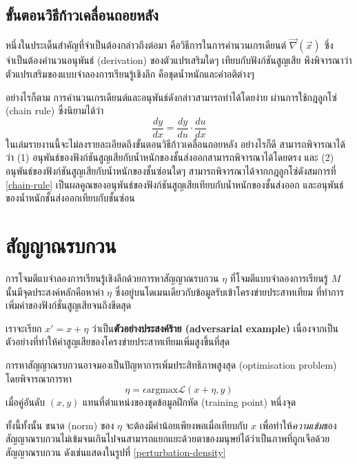 \documentclass{cpereport}
\begin{document}
\subsection{ขั้นตอนวิธีก้าวเคลื่อนถอยหลัง}

หนึ่งในประเด็นสำคัญที่จำเป็นต้องกล่าวถึงต่อมา คือวิธีการในการคำนวนเกรเดียนต์ $\vec{\nabla}(\vec{x})$ ซึ่งจำเป็นต้องคำนวนอนุพันธ์ (derivation) ของตัวแปรเสริมใดๆ เทียบกับฟังก์ชันสูญเสีย พึงพิจารณาว่าตัวแปรเสริมของแบบจำลองการเรียนรู้เชิงลึก คือชุดน้ำหนักและค่าอติต่างๆ

อย่างไรก็ตาม การคำนวนเกรเดียนต์และอนุพันธ์ดังกล่าวสามารถทำได้โดยง่าย ผ่านการใช้กฎลูกโซ่ (chain rule) ซึ่งนิยามได้ว่า
\begin{equation}
    \frac{dy}{dx} = \frac{dy}{du} \cdot \frac{du}{dx}
    \label{chain-rule}
\end{equation}
ในเล่มรายงานนี้จะไม่ลงรายละเอียดถึงขั้นตอนวิธีก้าวเคลื่อนถอยหลัง อย่างไรก็ดี สามารถพิจารณาได้ว่า (1) อนุพันธ์ของฟังก์ชันสูญเสียกับน้ำหนักของชั้นส่งออกสามารถพิจารณาได้โดยตรง และ (2) อนุพันธ์ของฟังก์ชันสูญเสียกับน้ำหนักของชั้นซ่อนใดๆ สามารถพิจารณาได้จากกฎลูกโซ่ดังสมการที่ \ref{chain-rule} เป็นผลคูณของอนุพันธ์ของฟังก์ชันสูญเสียเทียบกับน้ำหนักของชั้นส่งออก และอนุพันธ์ของน้ำหนักชั้นส่งออกเทียบกับชั้นซ่อน

\section{สัญญาณรบกวน}

การโจมตีแบจำลองการเรียนรู้เชิงลึกด้วยการหาสัญญาณรบกวน $\eta$ ที่โจมตีแบบจำลองการเรียนรู้ $M$ นั้นมีจุดประสงค์หลักคือหาค่า $\eta$ ซึ่งอยู่บนโดเมนเดียวกับข้อมูลรับเข้าโครงข่ายประสาทเทียม ที่ทำการเพิ่มค่าของฟังก์ชั่นสูญเสียจนถึงขีดสุด

เราจะเรียก $x' = x+\eta$ ว่าเป็น\textbf{ตัวอย่างประสงค์ร้าย (adversarial example)} เนื่องจากเป็นตัวอย่างที่ทำให้ค่าสูญเสียของโครงข่ายประสาทเทียมเพิ่มสูงขึ้นที่สุด

การหาสัญญาณรบกวนอาจมองเป็นปัญหาการเพิ่มประสิทธิภาพสูงสุด (optimisation problem) โดยพิจารณาการหา
\begin{equation}
    \eta = \epsilon \mathrm{argmax}\mathscr{L}\left(x+\eta, y\right)
    \label{perturbation}
\end{equation}
เมื่อคู่อันดับ $(x,y)$ แทนที่ตำแหน่งของชุดข้อมูลฝึกหัด (training point) หนึ่งจุด

ทั้งนี้ทั้งนั้น ขนาด (norm) ของ $\eta$ จะต้องมีค่าน้อยเพียงพอเมื่อเทียบกับ $x$ เพื่อทำให้\textit{ความเข้ม}ของสัญญาณรบกวนไม่เข้มจนเกินไปจนสามารถแยกแยะด้วยตาของมนุษย์ได้ว่าเป็นภาพที่ถูกเจือด้วยสัญญาณรบกวน ดังเช่นแสดงในรูปที่ \ref{perturbation-density}
\end{document}
